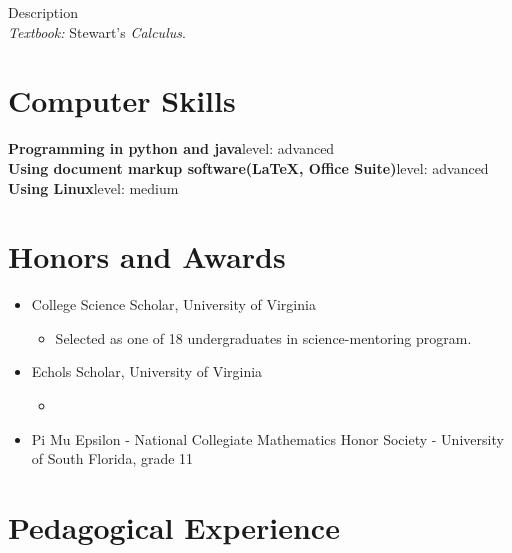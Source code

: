 \documentclass[11pt,letterpaper,sans]{moderncv}
\begin{document}
%
  {Description \\ \emph{Textbook: }Stewart's \emph{Calculus}.}


\section{Computer Skills}
\textbf{Programming in python and java}\quad level: advanced \\
\textbf{Using document markup software(\LaTeX, Office Suite)}\quad level: advanced \\
\textbf{Using Linux}\quad level: medium \\


\section{Honors and Awards}
\begin{itemize}
  \item College Science Scholar, University of Virginia
  \begin{itemize}
    \item Selected as one of 18 undergraduates in science-mentoring program.
  \end{itemize}

  \item Echols Scholar, University of Virginia
  \begin{itemize}
    \item
  \end{itemize}

  \item Pi Mu Epsilon - National Collegiate Mathematics Honor Society - University of South Florida, grade 11
\end{itemize}

\section{Pedagogical Experience}

%
\end{document}
